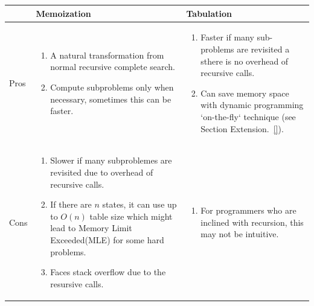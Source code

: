 \documentclass[../main.tex]{subfiles}
\begin{document}
\begin{table}[!ht]
\begin{small}
\centering
\noindent{}
\label{tab:dp_decidion_table}
 \noindent \begin{tabular}{|p{}|p{}|p{}| }
  \hline
& Memoization& Tabulation   \\ \hline
Pros  &\begin{enumerate}[wide, labelwidth=!, labelindent=0pt,noitemsep,topsep=0pt]\item A natural transformation from normal recursive complete search.
    \item Compute subproblems only when necessary, sometimes this can be faster. 
\end{enumerate} &\begin{enumerate}[wide, labelwidth=!, labelindent=0pt,noitemsep,topsep=0pt] \item Faster if many sub-problems are revisited a sthere is no overhead of recursive calls.\item Can save memory space with dynamic programming `on-the-fly` technique (see Section Extension.~\ref{}). \end{enumerate}\\\hline
 Cons  & \begin{enumerate}[wide, labelwidth=!, labelindent=0pt,noitemsep,topsep=0pt]
     \item Slower if many subproblemes are revisited due to overhead of recursive calls. 
     \item If there are $n$ states, it can use up to $O(n)$ table size which might lead to Memory Limit Exceeded(MLE) for some hard problems. 
     \item Faces stack overflow due to the resursive calls.
 \end{enumerate} &
 \begin{enumerate}[wide, labelwidth=!, labelindent=0pt,noitemsep,topsep=0pt]
     \item For programmers who are inclined with recursion, this may not be intuitive.
 \end{enumerate}\\ \hline
\end{tabular}
\end{small}
\end{table}
\end{document}
